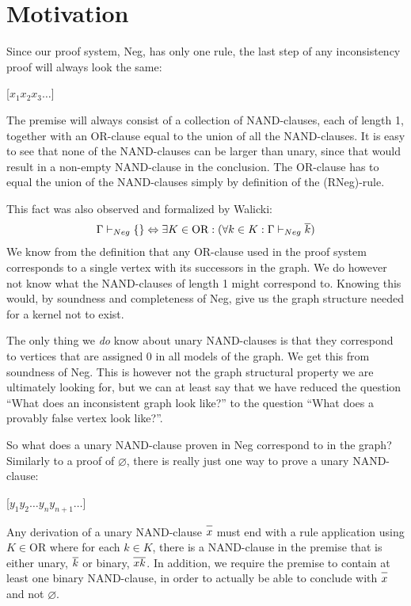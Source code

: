 \section{Motivation}
\label{sec:Motivation}
Since our proof system, Neg, has only one rule, the last step of any inconsistency proof will always look the same:
\begin{prooftree*}
  \Hypo{\dots}
  [$x_1x_2x_3\dots$]{\varnothing}
\end{prooftree*}
The premise will always consist of a collection of NAND-clauses, each of length 1, together with an OR-clause equal to the union of all the NAND-clauses.
It is easy to see that none of the NAND-clauses can be larger than unary, since that would result in a non-empty NAND-clause in the conclusion.
The OR-clause has to equal the union of the NAND-clauses simply by definition of the (RNeg)-rule.

This fact was also observed and formalized by Walicki\cite{michal-completeness}:
\begin{align}
  \Gamma \vdash_{Neg} \{\} \Leftrightarrow \exists K \in \text{OR}: (\forall  k \in K: \Gamma \vdash_{Neg} \ol{k})
\end{align}
We know from the definition that any OR-clause used in the proof system corresponds to a single vertex with its successors in the graph.
We do however not know what the NAND-clauses of length 1 might correspond to.
Knowing this would, by soundness and completeness of Neg, give us the graph structure needed for a kernel not to exist.

The only thing we \textit{do} know about unary NAND-clauses is that they correspond to vertices that are assigned 0 in all models of the graph.
We get this from soundness of Neg.
This is however not the graph structural property we are ultimately looking for, but we can at least say that we have reduced the question ``What does an inconsistent graph look like?'' to the question ``What does a provably false vertex look like?''.

So what does a unary NAND-clause proven in Neg correspond to in the graph?
Similarly to a proof of $\varnothing$, there is really just one way to prove a unary NAND-clause:
\begin{prooftree*}
  \Hypo{\dots}
  \Hypo{\dots}
  [$y_1y_2\dots y_ny_{n+1}\dots$]{}
\end{prooftree*}
Any derivation of a unary NAND-clause $\ol{x}$ must end with a rule application using $K \in \text{OR}$ where for each $k \in K$, there is a NAND-clause in the premise that is either unary, $\ol{k}$ or binary, $\ol{xk}$.
In addition, we require the premise to contain at least one binary NAND-clause, in order to actually be able to conclude with $\ol x$ and not $\varnothing$.

